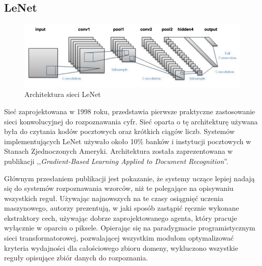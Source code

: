 \documentclass[12pt,a4paper,twoside,titlepage,openright]{book}
\begin{document}
\begin{itemize}

\section{LeNet}
\begin{figure}[ht]
	\centering
			\includegraphics[resolution=100, scale=0.6]{LeNet.png}
		\caption{Architektura sieci LeNet}
\end{figure}

Sieć zaprojektowana w 1998 roku, przedstawia pierwsze praktyczne zastosowanie sieci konwolucyjnej do rozpoznawania cyfr. Sieć oparta o tę architekturę używana była do czytania kodów pocztowych oraz krótkich ciągów liczb. Systemów implementujących LeNet używało około 10\% banków i instytucji pocztowych w Stanach Zjednoczonych Ameryki. Architektura została zaprezentowana w publikacji ,,\textit{Gradient-Based Learning Applied to Document Recognition}''.

Głównym przesłaniem publikacji jest pokazanie, że systemy uczące lepiej nadają się do systemów rozpoznawania wzorców, niż te polegające na opisywaniu wszystkich reguł. Używając najnowszych na te czasy osiągnięć uczenia maszynowego, autorzy prezentują, w jaki sposób zastąpić ręcznie wykonane ekstraktory cech, używając dobrze zaprojektowanego agenta, który pracuje wyłącznie w oparciu o piksele. Opierając się na paradygmacie programistycznym sieci transformatorowej, pozwalającej wszystkim modułom optymalizować kryteria wydajności dla całościowego zbioru domeny, wykluczono wszystkie reguły opisujące zbiór danych do rozpoznania.


\end{itemize}
\end{document}
